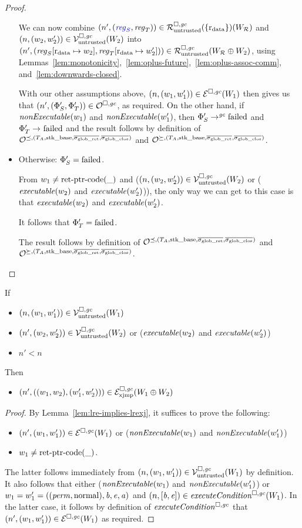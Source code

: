 \documentclass[a4paper]{article}
\begin{document}
\begin{proof}
\begin{itemize}
    We can now combine $\npair[n']{\stpair{\reg}{\reg}} \in \lrr(\{\rdata\}) (W_\lrrs )$ and $\npair{(w_2,w_2')} \in \lrv(W_2)$ into $\npair[n']{(\reg_S\update{\rdata}{w_2},\reg_T\update{\rdata}{w_2'})} \in \lrr (W_\lrrs \oplus W_2)$, using Lemmas~\ref{lem:monotonicity},~\ref{lem:oplus-future},~\ref{lem:oplus-assoc-comm}, and~\ref{lem:downwards-closed}.

    With our other assumptions above, $\npair{(w_1,w_1')} \in \lre(W_1)$ then gives us that $\npair[n']{(\Phi_S',\Phi_T')}\in \lro$, as required.
    On the other hand, if $\nonExec{w_1}$ and $\nonExec{w_1'}$, then $\Phi_S' \step[\gc] \failed$ and $\Phi_T' \step \failed$ and the result follows by definition of $\lrol$ and $\lror$.

  \item Otherwise: $\Phi_S' = \failed$.
    
    From $w_1 \neq \retptrc(\_)$ and ($\npair{(w_2,w_2')} \in \lrv(W_2)$ or ($\exec{w_2}$ and $\exec{w_2'}$)), the only way we can get to this case is that $\exec{w_2}$ and $\exec{w_2'}$.

    It follows that $\Phi_T' = \failed$.
    
    The result follows by definition of $\lrol$ and $\lror$.
  \end{itemize}
\end{proof}

\begin{lemma}
  \label{lem:safe-vals-safe-exec}
  If
  \begin{itemize}
  \item $\npair{(w_1,w_1')} \in \lrv(W_1)$
  \item $\npair[n']{(w_2,w_2')} \in \lrv(W_2)$ or ($\exec{w_2}$ and $\exec{w_2'}$)
  \item $n' < n$
  \end{itemize}
  Then
  \begin{itemize}
  \item $\npair[n']{((w_1,w_2),(w_1',w_2'))} \in \lrexj(W_1 \oplus W_2)$
  \end{itemize}
\end{lemma}
\begin{proof}
  By Lemma~\ref{lem:lre-implies-lrexj}, it suffices to prove the following: 
  \begin{itemize}
  \item $\npair[n']{(w_1,w_1')} \in \lre(W_1)$ or ($\nonExec{w_1}$ and $\nonExec{w_1'}$)
  \item $w_1 \neq \retptrc(\_)$.
  \end{itemize}

  The latter follows immediately from $\npair{(w_1,w_1')} \in \lrv(W_1)$ by definition.
  It also follows that either ($\nonExec{w_1}$ and $\nonExec{w_1'}$) or $w_1 = w_1' = ((\perm,\normal),\baddr,\eaddr,\aaddr)$ and $\npair{[\baddr,\eaddr]} \in \execCond{W_1}$.
  In the latter case, it follows by definition of $\execCond{}$ that $\npair[n']{(w_1,w_1')} \in \lre(W_1)$ as required.
\end{proof}
\end{document}
